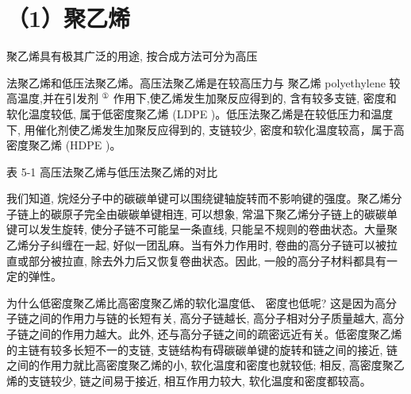 \documentclass[10pt]{article}
\newcommand{\customfootnote}[1]{
  \let\thefootnote\relax\footnotetext{#1}
}
\begin{document}
\section*{（1）聚乙烯}

聚乙烯具有极其广泛的用途, 按合成方法可分为高压

法聚乙烯和低压法聚乙烯。高压法聚乙烯是在较高压力与 聚乙烯 polyethylene 较高温度,并在引发剂 \({}^{\text{①}}\) 作用下,使乙烯发生加聚反应得到的, 含有较多支链, 密度和软化温度较低, 属于低密度聚乙烯 (LDPE )。低压法聚乙烯是在较低压力和温度下, 用催化剂使乙烯发生加聚反应得到的, 支链较少, 密度和软化温度较高，属于高密度聚乙烯 (HDPE )。

表 5-1 高压法聚乙烯与低压法聚乙烯的对比

\begin{center}
\end{center}

\customfootnote{

① 引发剂是用来引发聚合反应的物质。

}

我们知道, 烷烃分子中的碳碳单键可以围绕键轴旋转而不影响键的强度。聚乙烯分子链上的碳原子完全由碳碳单键相连, 可以想象, 常温下聚乙烯分子链上的碳碳单键可以发生旋转, 使分子链不可能呈一条直线, 只能呈不规则的卷曲状态。大量聚乙烯分子纠缠在一起, 好似一团乱麻。当有外力作用时, 卷曲的高分子链可以被拉直或部分被拉直, 除去外力后又恢复卷曲状态。因此, 一般的高分子材料都具有一定的弹性。

为什么低密度聚乙烯比高密度聚乙烯的软化温度低、 密度也低呢? 这是因为高分子链之间的作用力与链的长短有关, 高分子链越长, 高分子相对分子质量越大, 高分子链之间的作用力越大。此外, 还与高分子链之间的疏密远近有关。低密度聚乙烯的主链有较多长短不一的支链, 支链结构有碍碳碳单键的旋转和链之间的接近, 链之间的作用力就比高密度聚乙烯的小, 软化温度和密度也就较低; 相反, 高密度聚乙烯的支链较少, 链之间易于接近, 相互作用力较大, 软化温度和密度都较高。
\end{document}
